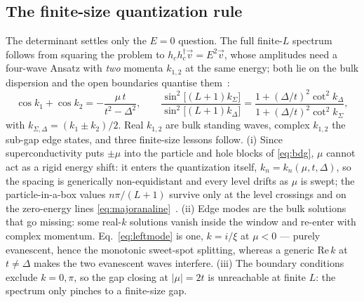 \subsection{The finite-size quantization rule}
\label{sec:quantrule}
The determinant settles only the $E = 0$ question. The full finite-$L$
spectrum follows from squaring the problem to
$h_c h_c^\dagger \vec v = E^2 \vec v$, whose amplitudes need a four-wave
Ansatz with \emph{two} momenta $k_{1,2}$ at the same energy; both lie on the
bulk dispersion and the open boundaries
quantise them~\cite{leumer2020,leumer2021thesis}:
\begin{equation}
  \cos k_1 + \cos k_2 = -\frac{\mu\,t}{t^2-\Delta^2},
  \qquad
  \frac{\sin^2\!\bigl[(L+1)k_\Sigma\bigr]}{\sin^2\!\bigl[(L+1)k_\Delta\bigr]}
  = \frac{1 + (\Delta/t)^2\cot^2 k_\Delta}
         {1 + (\Delta/t)^2\cot^2 k_\Sigma},
  \label{eq:quantrule}
\end{equation}
with $k_{\Sigma,\Delta} = (k_1 \pm k_2)/2$. Real $k_{1,2}$ are bulk standing
waves, complex $k_{1,2}$ the sub-gap edge states, and three finite-size
lessons follow. (i) Since superconductivity puts $\pm\mu$ into the particle
and hole blocks of \eqref{eq:bdg}, $\mu$ cannot act as a rigid energy shift:
it enters the quantization itself, $k_n = k_n(\mu,t,\Delta)$, so the spacing
is generically non-equidistant and every level drifts as $\mu$ is swept; the
particle-in-a-box values $n\pi/(L+1)$ survive only at the level crossings and
on the zero-energy lines \eqref{eq:majoranaline}~\cite{leumer2021thesis}.
(ii) Edge modes are the bulk solutions that go missing: some real-$k$
solutions vanish inside the window and re-enter with complex momentum.
Eq.~\eqref{eq:leftmode} is one, $k = i/\xi$ at $\mu<0$ --- purely evanescent,
hence the monotonic sweet-spot splitting, whereas a generic
$\mathrm{Re}\,k$ at $t \neq \Delta$ makes the two evanescent waves interfere. (iii) The boundary
conditions exclude $k = 0,\pi$, so the gap closing at $|\mu| = 2t$ is
unreachable at finite $L$: the spectrum only pinches to a finite-size gap.
